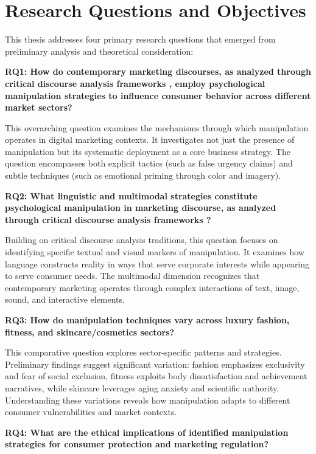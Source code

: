 \section{Research Questions and Objectives}
\label{sec:research_questions}

This thesis addresses four primary research questions that emerged from preliminary analysis and theoretical consideration:

\textbf{RQ1: How do contemporary marketing discourses, as analyzed through critical discourse analysis frameworks \cite{fairclough2015language}, employ psychological manipulation strategies to influence consumer behavior across different market sectors?}

This overarching question examines the mechanisms through which manipulation operates in digital marketing contexts. It investigates not just the presence of manipulation but its systematic deployment as a core business strategy. The question encompasses both explicit tactics (such as false urgency claims) and subtle techniques (such as emotional priming through color and imagery).

\textbf{RQ2: What linguistic and multimodal strategies constitute psychological manipulation in marketing discourse, as analyzed through critical discourse analysis frameworks \cite{fairclough2015language}?}

Building on critical discourse analysis traditions, this question focuses on identifying specific textual and visual markers of manipulation. It examines how language constructs reality in ways that serve corporate interests while appearing to serve consumer needs. The multimodal dimension recognizes that contemporary marketing operates through complex interactions of text, image, sound, and interactive elements.

\textbf{RQ3: How do manipulation techniques vary across luxury fashion, fitness, and skincare/cosmetics sectors?}

This comparative question explores sector-specific patterns and strategies. Preliminary findings suggest significant variation: fashion emphasizes exclusivity and fear of social exclusion, fitness exploits body dissatisfaction and achievement narratives, while skincare leverages aging anxiety and scientific authority. Understanding these variations reveals how manipulation adapts to different consumer vulnerabilities and market contexts.

\textbf{RQ4: What are the ethical implications of identified manipulation strategies for consumer protection and marketing regulation?}

